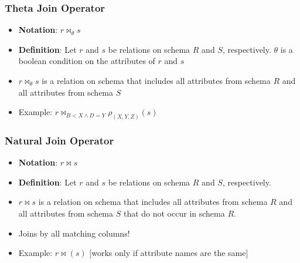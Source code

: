 \subsubsection{Theta Join Operator}
\begin{itemize}[label=\(\rhd\)]
    \item \textbf{Notation}: $r \bowtie_\theta s$
    \item \textbf{Definition}: Let $r$ and $s$ be relations on schema $R$ and $S$, respectively. $\theta$ is a boolean condition on the attributes of $r$ and $s$
    \item $r \bowtie_\theta s$ is a relation on schema that includes all attributes from schema $R$ and all attributes from schema $S$
    \item Example: $r \bowtie_{B<X\land D = Y} \rho_{(X,Y,Z)} (s)$
\end{itemize}

\subsubsection{Natural Join Operator}
\begin{itemize}[label=\(\rhd\)]
    \item \textbf{Notation}: $r \bowtie s$
    \item \textbf{Definition}: Let $r$ and $s$ be relations on schema $R$ and $S$, respectively.
    \item $r \bowtie s$ is a relation on schema that includes all attributes from schema $R$ and all attributes from schema $S$ that do not occur in schema $R$.
    \item Joins by all matching columns!
    \item Example: $r \bowtie (s)$ [works only if attribute names are the same]
\end{itemize}

